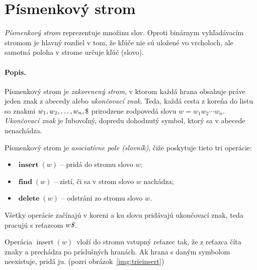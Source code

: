 
\def\k{w}
\def\put{$\mathop{insert}\left( \k\right)$}
\def\find{$\mathop{find}\left( \k\right)$}
\def\delete{$\mathop{delete}\left( \k\right)$}
\def\trie{trie}
\def\uz{{\tt\$}}

\section{Písmenkový strom}
\emph{Písmenkový strom} reprezentuje množinu slov. Oproti binárnym 
vyhľadávacím stromom je hlavný rozdiel v tom, že kľúče nie sú uložené 
vo vrcholoch, ale samotná poloha v strome určuje kľúč (slovo). 




\paragraph{Popis.}
Písmenkový strom je \emph{zakorenený strom}, v ktorom každá hrana obsahuje 
práve jeden znak z abecedy alebo \emph{ukončovací znak}. Teda, každá cesta 
z koreňa do listu so znakmi $w_1, w_2, \ldots, w_n, \uz$ prirodzene 
zodpovedá slovu $w=w_1w_2\cdots w_n$. \emph{Ukončovací znak} je ľubovoľný, 
dopredu dohodnutý symbol, ktorý sa v abecede nenachádza. 

Písmenkový strom je \emph{asociatívne pole (slovník)}, čiže 
poskytuje tieto tri operácie:
\begin{itemize}
\item $\mathop{\mathbf{insert}}(\k)$ -- pridá do stromu slovo $\k$;
\item $\mathop{\mathbf{find}}(\k)$ -- zistí, či sa v strom slovo $\k$ nachádza;
\item $\mathop{\mathbf{delete}}(\k)$ -- odstráni zo stromu slovo $\k$.
\end{itemize}
Všetky operácie začínajú v koreni a ku slovu pridávajú ukončovací znak, 
teda pracujú s reťazcom $\k\emph{\$}$. 

Operácia \put\ vloží do stromu vstupný reťazec tak, že z reťazca číta znaky 
a prechádza po príslušných hranách. Ak hrana s daným symbolom neexistuje, 
pridá ju. (pozri obrázok~\ref{img:trieinsert})

